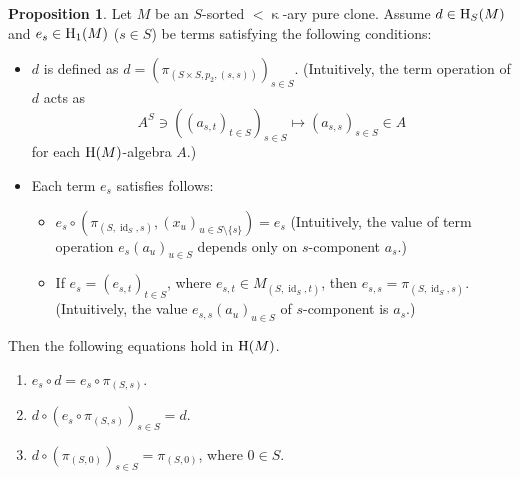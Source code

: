 \documentclass[a4paper,10pt]{article}
\theoremstyle{definition}
\newtheorem{prop}[df]{Proposition}
\DeclareMathOperator{\id}{id}
\newcommand\sm{\setminus}
\newcommand\mc{\mathclose}
\begin{document}
\begin{prop}
Let $M$ be an $S$-sorted $<\mc\kappa$-ary pure clone.
Assume $d\in {\rm H}_S(M)$ and $e_s\in {\rm H}_1(M)$ ($s\in S$)
be terms satisfying the following conditions:
\begin{itemize}
\item
$d$ is defined as $d=(\pi_{(S\times S,p_2,(s,s))})_{s\in S}$.
(Intuitively, the term operation of $d$ acts as
\[
A^S\ni ((a_{s,t})_{t\in S})_{s\in S}\mapsto (a_{s,s})_{s\in S}\in A
\]
for each ${\rm H}(M)$-algebra $A$.)
\item
Each term $e_s$ satisfies follows:
\begin{itemize}
\item
$e_s\circ(\pi_{(S,\id_S,s)},(x_u)_{u\in S\sm\{s\}})=e_s$
(Intuitively, the value of term operation $e_s(a_u)_{u\in S}$
depends only on $s$-component $a_s$.)
\item
If $e_s=(e_{s,t})_{t\in S}$, where $e_{s,t}\in M_{(S,\id_S,t)}$,
then $e_{s,s}=\pi_{(S,\id_S,s)}$.
(Intuitively, the value $e_{s,s}(a_u)_{u\in S}$ of $s$-component
is $a_s$.)
\end{itemize}
\end{itemize}
Then the following equations hold in ${\rm H}(M)$.
\begin{enumerate}
\item
$e_s\circ d=e_s\circ \pi_{(S,s)}$.
\item
$d\circ(e_s\circ \pi_{(S,s)})_{s\in S}=d$.
\item
$d\circ (\pi_{(S,0)})_{s\in S}=\pi_{(S,0)}$, where $0\in S$.
\end{enumerate}
\end{prop}
\end{document}
